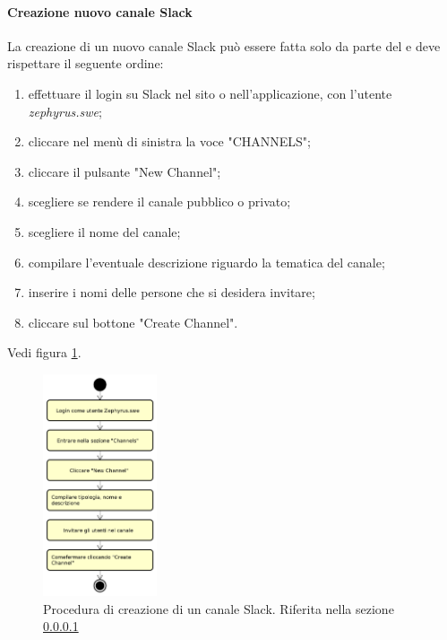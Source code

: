        	\paragraph{Creazione nuovo canale Slack}\label{sec:CreaCanale}
		La creazione di un nuovo canale Slack può essere fatta solo da parte del \responsabile{} e deve rispettare il seguente ordine:
		\begin{enumerate}
			\item effettuare il login su Slack nel sito o nell'applicazione, con l'utente \textit{zephyrus.swe};
			\item cliccare nel menù di sinistra la voce "CHANNELS";
			\item cliccare il pulsante "New Channel";
			\item scegliere se rendere il canale pubblico o privato;
			\item scegliere il nome del canale;
			\item compilare l'eventuale descrizione riguardo la tematica del canale;
			\item inserire i nomi delle persone che si desidera invitare;
			\item cliccare sul bottone "Create Channel".
		\end{enumerate}
		Vedi figura \ref{fig:ProCreaCanale}.
		\begin{figure}[h!]
			\centering
			\includegraphics[width=0.3\textwidth]{img/CreazioneCanaleSlack}
			\caption{Procedura di creazione di un canale Slack. Riferita nella sezione \ref{sec:CreaCanale}}
			\label{fig:ProCreaCanale}
		\end{figure}\mbox{}\\
